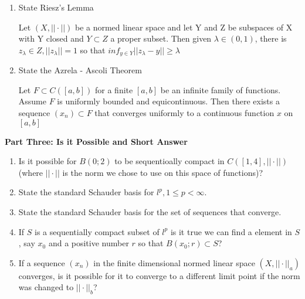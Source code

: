\documentclass[11pt]{SelfArxOneColBMN}
\begin{document}
\begin{enumerate}
  \item State Riesz's Lemma
  \begin{solution}
    Let $(X,||\cdot||)$ be a normed linear space and let Y and Z be subspaces of X with Y closed and $Y \subset Z$ a proper subset. Then given $\lambda \in (0,1)$, there is $z_\lambda \in Z, ||z_\lambda|| = 1$ so that $inf_{y \in Y}||z_\lambda - y|| \geq \lambda$
  \end{solution}
  \item State the Azrela - Ascoli Theorem
  \begin{solution}
    Let $F \subset C([a,b])$ for a finite $[a,b]$ be an infinite family of functions. Assume $F$ is uniformly bounded and equicontinuous. Then there exists a sequence $(x_n) \subset F$ that converges uniformly to a continuous function $x$ on $[a,b]$
  \end{solution}
\end{enumerate}

\textbf{Part Three: Is it Possible and Short Answer}
\begin{enumerate}
  \item Is it possible for $B(0;2)$ to be sequentioally compact in $C([1,4],||\cdot||)$ (where $||\cdot||$ is the norm we chose to use on this space of functions)?
  \item State the standard Schauder basis for $l^p, 1 \leq p < \infty$.
  \item State the standard Schauder basis for the set of sequences that converge.
  \item If $S$ is a sequentially compact subset of $l^p$ is it true we can find a element in $S$, say $x_0$ and a positive number $r$ so that $B(x_0;r) \subset S$?
  \item If a sequence $(x_n)$ in the finite dimensional normed linear space $(X,||\cdot||_a)$ converges, is it possible for it to converge to a different limit point if the norm was changed to $||\cdot||_b$?
\end{enumerate}
\end{document}
